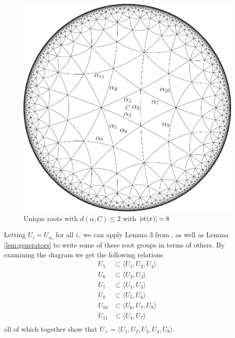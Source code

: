 \documentclass[class=book, crop=false]{standalone}
\begin{document}
	\begin{figure}[h]
	\begin{center}
		\includegraphics[width=6.5 in]{diagrams/roots334.pdf}
	\end{center}	
	\caption{Unique roots with $d(\alpha,C)\le 2$ with $|\mathrm{st}(x)|=8$}
	\label{fig:root334}
	\end{figure}

Letting $U_i=U_{\alpha_i}$ for all $i,$ we can apply Lemma 3 from \cite{buildings}, as well as Lemma \ref{lem:generators} to write some of these root groups in terms of others. By examining the diagram we get the following relations
\begin{align*}
	U_5&\subset \langle U_1,U_2,U_4\rangle\\
	U_6&\subset \langle U_2,U_3\rangle\\
	U_7&\subset \langle U_1,U_3\rangle\\
	U_8&\subset \langle U_5,U_6\rangle\\
	U_{10}&\subset \langle U_6,U_7,U_9\rangle\\
	U_{11}&\subset \langle U_4,U_7\rangle\\
\end{align*}
all of which together show that $U_+=\langle U_1,U_2,U_3,U_4,U_9\rangle.$
\end{document}
